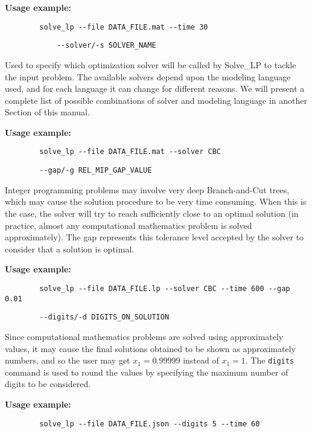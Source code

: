 \documentclass[12pt,hidelinks]{article}
\begin{document}
	\textbf{Usage example:} 
	\begin{verbatim}
		solve_lp --file DATA_FILE.mat --time 30
	\end{verbatim}

	{\color{mordantred19}
		\begin{verbatim}
			--solver/-s SOLVER_NAME
		\end{verbatim}
	} Used to specify which optimization solver will be called by Solve\_LP to tackle the input problem. The available solvers depend upon the modeling language used, and for each language it can change for different reasons. We will present a complete list of possible combinations of solver and modeling language in another Section of this manual.
	
	\textbf{Usage example:} 
	\begin{verbatim}
		solve_lp --file DATA_FILE.mat --solver CBC
	\end{verbatim}

	{\color{mordantred19}
	\begin{verbatim}
		--gap/-g REL_MIP_GAP_VALUE
	\end{verbatim}
	} Integer programming problems may involve very deep Branch-and-Cut trees, which may cause the solution procedure to be very time consuming. When this is the case, the solver will try to reach sufficiently close to an optimal solution (in practice, almost any computational mathematics problem is solved approximately). The gap represents this tolerance level accepted by the solver to consider that a solution is optimal.
	
	\textbf{Usage example:} 
	\begin{verbatim}
		solve_lp --file DATA_FILE.lp --solver CBC --time 600 --gap 0.01
	\end{verbatim}

	{\color{mordantred19}
	\begin{verbatim}
		--digits/-d DIGITS_ON_SOLUTION
	\end{verbatim}
	} Since computational mathematics problems are solved using approximately values, it may cause the final solutions obtained to be shown as approximately numbers, and so the user may get $x_1 = 0.99999$ instead of $x_1 = 1$. The \texttt{digits} command is used to round the values by specifying the maximum number of digits to be considered.
	
	\textbf{Usage example:} 
	\begin{verbatim}
		solve_lp --file DATA_FILE.json --digits 5 --time 60
	\end{verbatim}
\end{document}
